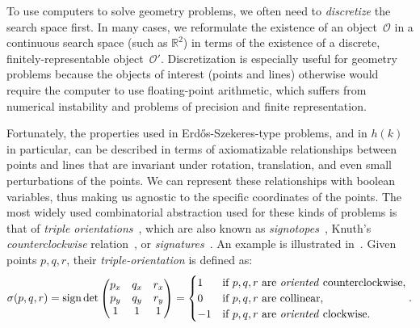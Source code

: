 To use computers to solve geometry problems,
we often need to \emph{discretize} the search space first.
In many cases,
we reformulate the existence of an object~$\mathcal{O}$ in a continuous search space (such as $\mathbb{R}^2$)
in terms of the existence of a discrete, finitely-representable object~$\mathcal{O}'$.
Discretization is especially useful for geometry problems because the objects of interest (points and lines) otherwise would require the computer to use floating-point arithmetic,
which suffers from numerical instability and problems of precision and finite representation.

Fortunately,
the properties used in Erd\H{o}s-Szekeres-type problems,
and in $h(k)$ in particular,
can be described in terms of axiomatizable relationships between points and lines
that are invariant under rotation, translation, and even small perturbations of the points.
We can represent these relationships with boolean variables,
thus making us agnostic to the specific coordinates of the points.
The most widely used combinatorial abstraction used for these kinds of problems is that of \emph{triple orientations}~\cite{ emptyHexagonNumber, scheucherTwoDisjoint5holes2020},
which are also known as \emph{signotopes}~\cite{felsnerSweepsArrangementsSignotopes2001,subercaseaux2023minimizing},
Knuth's \emph{counterclockwise} relation~\cite{knuthAxiomsHulls1992},
or \emph{signatures}~\cite{szekeres_peters_2006}.
An example is illustrated in~.
Given points $p, q, r$, their \emph{triple-orientation} is defined as:
\fi
\newcommand{\sign}{\operatorname{sign}}
\[
  \sigma(p, q, r) = \sign \det \begin{pmatrix} p_x & q_x & r_x \\ p_y & q_y & r_y \\ 1 & 1 & 1 \end{pmatrix} = \begin{cases}
    1 & \text{if } p, q, r \text{ are \emph{oriented} counterclockwise}, \\
    0 & \text{if } p, q, r \text{ are collinear}, \\
    -1 & \text{if } p, q, r \text{ are \emph{oriented} clockwise}.
  \end{cases}.
\]

